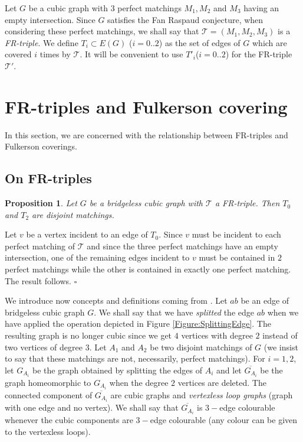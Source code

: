 \documentclass{amsart}
\newtheorem{prop}[thm]{Proposition}
\theoremstyle{definition}
\theoremstyle{remark}
\newenvironment{prf}{{\bf \noindent Proof } }{\hfill$\square$\\}
\begin{document}
Let $G$ be a cubic graph with $3$ perfect matchings $M_{1}, M_{2}$
and $M_{3}$ having an empty intersection. Since $G$ satisfies the
Fan Raspaud conjecture, when considering these perfect matchings,
we shall say that $\mathcal T=(M_{1}, M_{2},M_{3})$ is a {\em
FR-triple}. We define $T_{i} \subset E(G)$ ($i=0..2$) as the set of
edges of $G$ which are covered $i$ times by $\mathcal T$. It will be
convenient to use $T'_{i}$($i=0..2$) for the FR-triple $\mathcal
T'$.

\section{FR-triples and Fulkerson covering}


 In
this section, we are concerned with the relationship between
FR-triples and Fulkerson coverings.

\subsection{On FR-triples}

\begin{prop} \label{Proposition:StructureFR}
Let $G$ be a bridgeless cubic graph with $\mathcal T$ a FR-triple.
Then $T_{0}$ and $T_{2}$ are disjoint matchings.
\end{prop}
\begin{prf}
Let $v$ be a vertex incident to an edge of $T_{0}$. Since $v$ must
be incident to each perfect matching of $\mathcal T$ and since the
three perfect matchings have an empty intersection, one of the
remaining edges incident to $v$ must be contained in $2$ perfect
matchings while the other is contained in exactly one perfect
matching. The result follows.
\end{prf}


We introduce now  concepts and definitions coming from
\cite{HaoNiuWanZhaZha2009}. Let $ab$ be an edge of bridgeless cubic
graph $G$. We shall say that we have {\em splitted} the edge $ab$
when we have applied the operation depicted in Figure
\ref{Figure:SplittingEdge}. The resulting graph is no longer cubic
since we get $4$ vertices with degree $2$ instead of two vertices of
degree $3$. Let $A_{1}$ and $A_{2}$ be two disjoint matchings of $G$
(we insist to say that these matchings are not, necessarily, perfect
matchings).  For $i=1,2$, let $G_{A_{i}}$ be the graph obtained by
splitting the edges of $A_{i}$ and let $\overline{G_{A_{i}}}$ be the
graph homeomorphic to $G_{A_{i}}$ when the degree $2$ vertices are
deleted. The connected component of $\overline{G_{A_{i}}}$ are cubic
graphs and {\em vertexless loop graphs} (graph with one edge and no
vertex). We shall say that $\overline{G_{A_{i}}}$  is $3-$edge
colourable whenever the cubic components are $3-$edge colourable
(any colour can be given to the vertexless loops).
\end{document}

